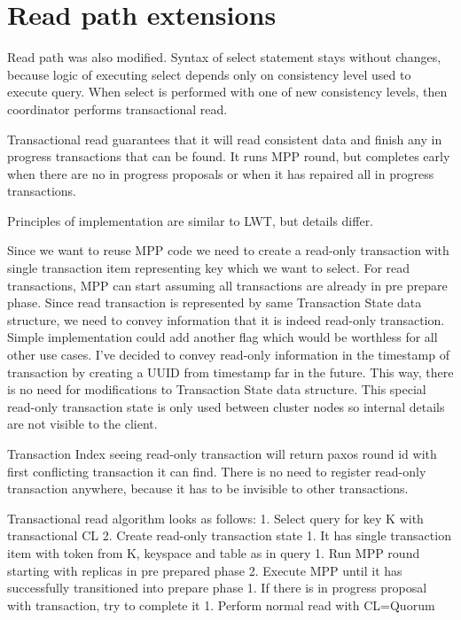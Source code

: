 \section{Read path extensions}
Read path \cite{CassandraReadPath} was also modified. Syntax of select statement stays without changes, because logic of executing select depends only on consistency level used to execute query.  When select is performed with one of new consistency levels, then coordinator performs transactional read.


Transactional read guarantees that it will read consistent data and finish any in progress transactions that can be found. It runs MPP round, but completes early when there are no in progress proposals or when it has repaired all in progress transactions.


Principles of implementation are similar to LWT, but details differ.


Since we want to reuse MPP code we need to create a read-only transaction with single transaction item representing key which we want to select. For read transactions, MPP can start assuming all transactions are already in pre prepare phase. Since read transaction is represented by same Transaction State data structure, we need to convey information that it is indeed read-only transaction. Simple implementation could add another flag which would be worthless for all other use cases. I’ve decided to convey read-only information in the timestamp of transaction by creating a UUID from timestamp far in the future. This way, there is no need for modifications to Transaction State data structure. This special read-only transaction state is only used between cluster nodes so internal details are not visible to the client.


Transaction Index seeing read-only transaction will return paxos round id with first conflicting transaction it can find. There is no need to register read-only transaction anywhere, because it has to be invisible to other transactions.


Transactional read algorithm looks as follows:
1. Select query for key K with transactional CL
2. Create read-only transaction state
   1. It has single transaction item with token from K, keyspace and table as in query
1. Run MPP round starting with replicas in pre prepared phase
2. Execute MPP until it has successfully transitioned into prepare phase
   1. If there is in progress proposal with transaction, try to complete it
1. Perform normal read with CL=Quorum



